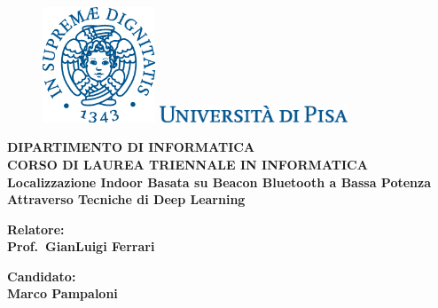 \documentclass[12pt]{report}
\begin{document}
\begin{titlepage}
  \begin{figure}[t]
    \centering\includegraphics[width=0.3\textwidth]{./img/cherubino.eps}

    \vspace{0.5cm}
    \centering\includegraphics[width=0.5\textwidth]{./img/logo.eps}
  \end{figure}

  \begin{center}
    \textbf{ DIPARTIMENTO DI INFORMATICA\\ CORSO DI LAUREA TRIENNALE IN INFORMATICA\\}
    \vspace{15mm}
    {\LARGE{\bf Localizzazione Indoor Basata su Beacon Bluetooth a Bassa Potenza
        Attraverso Tecniche di Deep Learning}}\\
  \end{center}

  \vspace{20mm}

  \begin{minipage}[t]{0.47\textwidth}
    {\large{\bf Relatore:\\ Prof.\ GianLuigi Ferrari 
      }}
  \end{minipage}\hfill
  \begin{minipage}[t]{0.47\textwidth}\raggedleft
    {\large{\bf Candidato: \\ Marco Pampaloni}}
  \end{minipage}

  \vfill



\end{titlepage}
\end{document}
